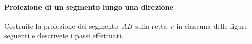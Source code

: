 \paragraph{Proiezione di un segmento lungo una direzione}

\begin{esercizio}
\label{ese:G.11}
Costruite la proiezione del segmento~\(AB\) sulla retta~\(r\) in ciascuna delle 
figure seguenti e descrivete i passi effettuati.
\begin{inaccessibleblock}
\begin{center}\scalebox{.8}{\proiezioniese}\end{center}
\label{fig:eseproiezioni}
\end{inaccessibleblock}
\end{esercizio}

